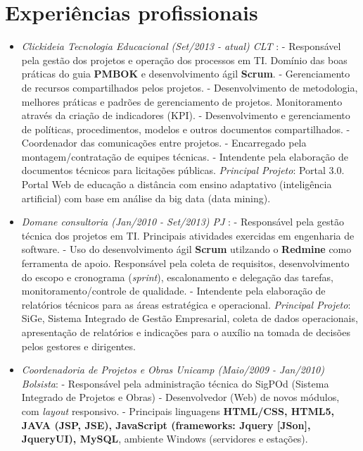 \documentclass[a4paper,10pt]{article}
\begin{document}
\section{Experiências profissionais}
\begin{itemize}

\item \emph{Clickideia Tecnologia Educacional (Set/2013 - atual) CLT }: 
  \subitem - Responsável pela gestão dos projetos e operação dos processos em TI. Domínio das boas práticas do guia  \textbf{PMBOK} e desenvolvimento ágil \textbf{Scrum}.
  \subitem - Gerenciamento de recursos compartilhados pelos projetos.
  \subitem - Desenvolvimento de metodologia, melhores práticas e padrões de gerenciamento de projetos. Monitoramento através da criação de indicadores (KPI).
  \subitem - Desenvolvimento e gerenciamento de políticas, procedimentos, modelos e outros documentos compartilhados.
  \subitem - Coordenador das comunicações entre projetos.
  \subitem - Encarregado pela montagem/contratação de equipes técnicas.
  \subitem - Intendente pela elaboração de documentos técnicos para licitações públicas.
  \subitem \emph{Principal Projeto}: Portal 3.0. Portal Web de educação a distância com ensino adaptativo (inteligência artificial) com base em análise da big data (data mining).

\item \emph{Domane consultoria (Jan/2010 - Set/2013) PJ }: 
  \subitem - Responsável pela gestão técnica dos projetos em TI. Principais atividades exercidas em engenharia de software.
  \subitem - Uso do desenvolvimento ágil \textbf{Scrum} utilzando o \textbf{Redmine} como ferramenta de apoio. Responsável pela coleta de requisitos, desenvolvimento do escopo e cronograma (\textit{sprint}), escalonamento e delegação das tarefas, monitoramento/controle de qualidade.
  \subitem - Intendente pela elaboração de relatórios técnicos para as áreas estratégica e operacional.
  \subitem \emph{Principal Projeto}:  SiGe, Sistema Integrado de Gestão Empresarial, coleta de dados operacionais, apresentação de relatórios e indicações para o auxílio na tomada de decisões pelos gestores e dirigentes.

\item \emph{Coordenadoria de Projetos e Obras Unicamp (Maio/2009 - Jan/2010) Bolsista}: 
  \subitem - Responsável pela administração técnica do SigPOd (Sistema Integrado de Projetos e Obras)
  \subitem - Desenvolvedor (Web) de novos módulos, com \textit{layout} responsivo.
  \subitem - Principais linguagens \textbf{HTML/CSS, HTML5, JAVA (JSP, JSE), JavaScript (frameworks: Jquery [JSon], JqueryUI), MySQL}, ambiente Windows (servidores e estações).
  

\end{itemize}
\end{document}
